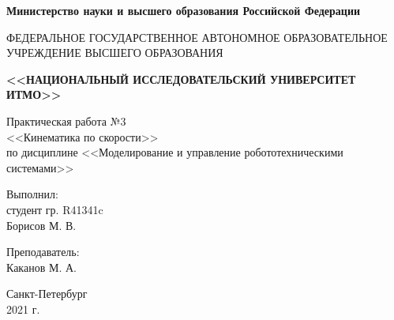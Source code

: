 \begin{titlepage}
    \begin{center}
        \begin{small}
            \textbf{Министерство науки и высшего образования Российской Федерации}

            \vspace{1em}

            ФЕДЕРАЛЬНОЕ ГОСУДАРСТВЕННОЕ АВТОНОМНОЕ ОБРАЗОВАТЕЛЬНОЕ\\
            УЧРЕЖДЕНИЕ ВЫСШЕГО ОБРАЗОВАНИЯ

            \vspace{1em}

            \textbf{<<НАЦИОНАЛЬНЫЙ ИССЛЕДОВАТЕЛЬСКИЙ УНИВЕРСИТЕТ ИТМО>>}
        \end{small}

        \vspace{13ex}

        Практическая работа №3\\
        <<Кинематика по скорости>>\\
        по дисциплине <<Моделирование и управление робототехническими системами>>
    \end{center}

    \vspace{14em}

    \begin{flushright}
        \noindent
        Выполнил:\\
        студент гр. R41341c\\
        Борисов М. В.

        \vspace{1em}
        Преподаватель:\\
        Каканов М. А.
    \end{flushright}

    \vfill

    \begin{center}
        \large{Санкт-Петербург}\\
        2021 г.\\
    \end{center}
\end{titlepage}
